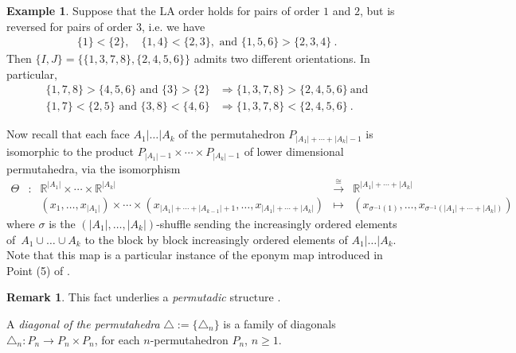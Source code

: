 \documentclass{amsart}
\theoremstyle{definition}
\newtheorem{example}[theorem]{Example}
\newtheorem{remark}[theorem]{Remark}
\newcommand{\R}{\mathbb{R}} %
\renewcommand{\implies}{\Rightarrow} %
\newcommand{\LA}{\mathrm{LA}}
\begin{document}
\begin{example} 
\label{ex:Non-coherent order contradiction}
Suppose that the $\LA$ order holds for pairs of order $1$ and $2$, but is reversed for pairs of order $3$, i.e. we have 
\begin{align*}
    \{1\}<\{2\},\quad \{1,4\}< \{2,3\}, \text{ and } \{1, 5, 6 \} > \{2, 3, 4\} \ .
\end{align*}
Then $\{I,J\}=\{\{1, 3, 7, 8\}, \{2, 4, 5, 6\}\}$ admits two different orientations.
In particular, 
\begin{align*}
    \{1, 7, 8\} > \{ 4, 5, 6 \} \text{ and } \{3\} > \{2\} &\implies \{1, 3, 7, 8\} >\{2, 4, 5, 6\} \ \text{and} \\
    \{1, 7\}< \{2, 5\} \text{ and } \{3, 8\}< \{4, 6\} &\implies \{1, 3, 7, 8\} <\{2, 4, 5, 6\} \ .
\end{align*}
\end{example}

Now recall that each face $A_1 | \ldots | A_k$ of the permutahedron $P_{|A_1|+\cdots + |A_k|-1}$ is isomorphic to the product $P_{|A_1|-1} \times \cdots \times P_{|A_k|-1}$ of lower dimensional permutahedra, via the isomorphism
\begin{equation*}
    \begin{matrix}
        \Theta & : & \R^{|A_1|} \times \cdots \times \R^{|A_k|} & \overset{\cong}{\longrightarrow} & \R^{|A_1|+\cdots+|A_k|} \\
         & & (x_1,\ldots,x_{|A_1|}) \times \cdots \times (x_{|A_1|+\cdots +|A_{k-1}|+1}, \ldots, x_{|A_1|+\cdots +|A_k|})  & \mapsto & (x_{\sigma^{-1}(1)},\ldots,x_{\sigma^{-1}(|A_1|+\cdots +|A_k|)})
    \end{matrix}
\end{equation*}
where $\sigma$ is the $(|A_1|,\ldots,|A_k|)$-shuffle sending the increasingly ordered elements of~$A_1 \cup \ldots \cup A_k$ to the block by block increasingly ordered elements of $A_1 | \ldots | A_k$.
Note that this map is a particular instance of the eponym map introduced in Point (5) of \cite[Prop. 2.3]{LA21}.

\begin{remark}
    This fact underlies a \emph{permutadic} structure \cite{LodayRonco11,MARKL2020105277}.
\end{remark}

A \emph{diagonal of the permutahedra} $\triangle:=\{\triangle_n\}$ is a family of diagonals $\triangle_n : P_n \to P_n \times P_n$, for each $n$-permutahedron $P_n$, $ n \geq 1$. 
\end{document}
